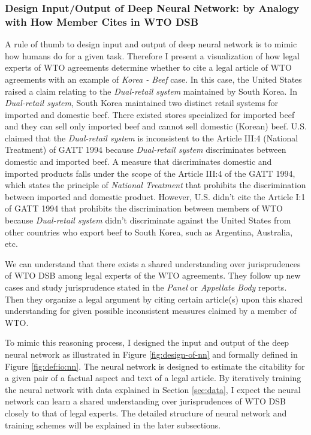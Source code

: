 \documentclass[12pt,letterpaper]{article}
\begin{document}
\subsubsection{Design Input/Output of Deep Neural Network: by Analogy with How Member Cites in WTO DSB} \label{design:io}
A rule of thumb to design input and output of deep neural network is to mimic
how humans do for a given task.
Therefore I present a visualization of how legal experts of WTO agreements determine whether to cite a legal article of WTO agreements with an example of \textit{Korea - Beef} case. %
In this case, the United States raised a claim relating to the \textit{Dual-retail system} maintained by South Korea. In \textit{Dual-retail system}, South Korea maintained two distinct retail systems
for imported and domestic beef. There existed stores specialized for imported beef and they can sell only imported beef and cannot sell domestic (Korean) beef. U.S. claimed that the \textit{Dual-retail system} is inconsistent to the Article III:4 (National Treatment) of GATT 1994
because \textit{Dual-retail system} discriminates between domestic and imported beef. A measure that discriminates domestic and imported products falls under the scope of the Article III:4 of the GATT 1994, which states the principle of \textit{National Treatment} that prohibits the discrimination between imported and domestic product. However, U.S. didn't
cite the Article I:1 of GATT 1994 that prohibits the discrimination between members of WTO
because \textit{Dual-retail system} didn't discriminate against the United States from other countries who export beef to South Korea, such as Argentina, Australia, etc.
 
We can understand that there exists a shared understanding over jurisprudences of WTO DSB among legal experts of the WTO agreements. They follow up new cases and study jurisprudence stated in the \textit{Panel} or  \textit{Appellate Body} reports.
Then they organize a legal argument by citing certain article(s) upon this shared understanding for given possible inconsistent measures claimed by a member of WTO.
 
To mimic this reasoning process, I designed the input and output of the deep neural network as illustrated in Figure \ref{fig:design-of-nn} and formally defined in Figure \ref{fig:def:io:nn}.
The neural network is designed to estimate the citability for a given pair of a factual aspect and text of a legal article.
By iteratively training the neural network with data explained in Section \ref{sec:data}, I expect the neural network can learn a shared understanding over jurisprudences of WTO DSB closely to that of legal experts.
The detailed structure of neural network and training schemes will be explained in the later subsections.

\end{document}
